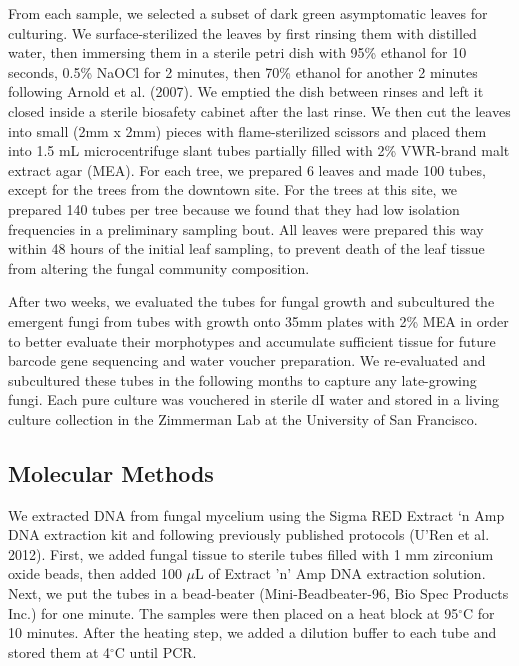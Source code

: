 \documentclass[fleqn,10pt,lineno]{wlpeerj} %
\begin{document}
From each sample, we selected a subset of dark green asymptomatic leaves for culturing. We surface-sterilized the leaves by first rinsing them with distilled water, then immersing them in a sterile petri dish with 95\% ethanol for 10 seconds, 0.5\% NaOCl for 2 minutes, then 70\% ethanol for another 2 minutes following Arnold et al. (2007). We emptied the dish between rinses and left it closed inside a sterile biosafety cabinet after the last rinse. We then cut the leaves into small (2mm x 2mm) pieces with flame-sterilized scissors and placed them into 1.5 mL microcentrifuge slant tubes partially filled with 2\% VWR-brand malt extract agar (MEA). For each tree, we prepared 6 leaves and made 100 tubes, except for the trees from the downtown site. For the trees at this site, we prepared 140 tubes per tree because we found that they had low isolation frequencies in a preliminary sampling bout. All leaves were prepared this way within 48 hours of the initial leaf sampling, to prevent death of the leaf tissue from altering the fungal community composition.

After two weeks, we evaluated the tubes for fungal growth and subcultured the emergent fungi from tubes with growth onto 35mm plates with 2\% MEA in order to better evaluate their morphotypes and accumulate sufficient tissue for future barcode gene sequencing and water voucher preparation. We re-evaluated and subcultured these tubes in the following months to capture any late-growing fungi. Each pure culture was vouchered in sterile dI water and stored in a living culture collection in the Zimmerman Lab at the University of San Francisco.

\hypertarget{molecular-methods}{%
\subsection*{Molecular Methods}\label{molecular-methods}}

We extracted DNA from fungal mycelium using the Sigma RED Extract `n Amp DNA extraction kit and following previously published protocols (U'Ren et al. 2012). First, we added fungal tissue to sterile tubes filled with 1 mm zirconium oxide beads, then added 100 \(\mu\)L of Extract 'n' Amp DNA extraction solution. Next, we put the tubes in a bead-beater (Mini-Beadbeater-96, Bio Spec Products Inc.) for one minute. The samples were then placed on a heat block at 95\(^{\circ}\)C for 10 minutes. After the heating step, we added a dilution buffer to each tube and stored them at 4\(^{\circ}\)C until PCR.
\end{document}
